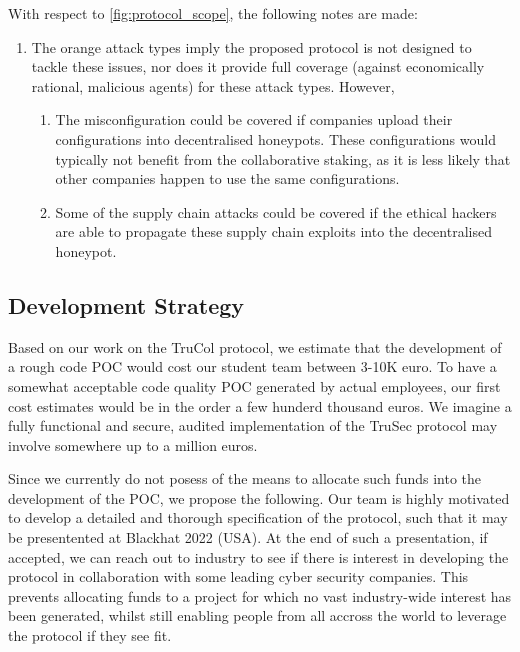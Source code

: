 With respect to \cref{fig:protocol_scope}, the following notes are made:
\begin{enumerate} 
    \item The orange attack types imply the proposed protocol is not designed to tackle these issues, nor does it provide full coverage (against economically rational, malicious agents) for these attack types. However,
    \begin{enumerate}
        \item The misconfiguration could be covered if companies upload their configurations into decentralised honeypots. These configurations would typically not benefit from the collaborative staking, as it is less likely that other companies happen to use the same configurations.
        \item Some of the supply chain attacks could be covered if the ethical hackers are able to propagate these supply chain exploits into the decentralised honeypot.
    \end{enumerate}
\end{enumerate}

\subsection{Development Strategy}
Based on our work on the TruCol protocol, we estimate that the development of a rough code POC would cost our student team between 3-10K euro. To have a somewhat acceptable code quality POC generated by actual employees, our first cost estimates would be in the order a few hunderd thousand euros. We imagine a fully functional and secure, audited implementation of the TruSec protocol may involve somewhere up to a million euros. 

Since we currently do not posess of the means to allocate such funds into the development of the POC, we propose the following. Our team is highly motivated to develop a detailed and thorough specification of the protocol, such that it may be presentented at Blackhat 2022 (USA). At the end of such a presentation, if accepted, we can reach out to industry to see if there is interest in developing the protocol in collaboration with some leading cyber security companies. This prevents allocating funds to a project for which no vast industry-wide interest has been generated, whilst still enabling people from all accross the world to leverage the protocol if they see fit.